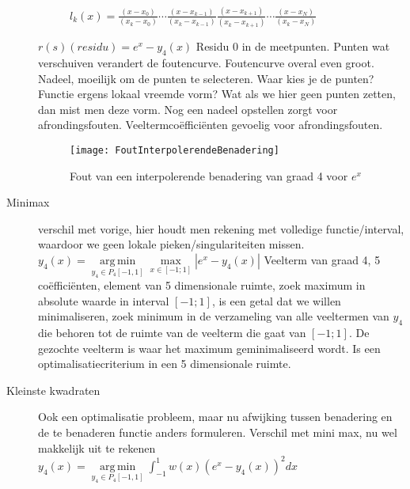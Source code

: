 \begin{exam}
\begin{description}
\begin{description}
			            \\
			            \begin{form}
				            $l_k(x)={\frac {(x-x_{0})}{(x_{k}-x_{0})}}\cdots {\frac {(x-x_{k-1})}{(x_{k}-x_{k-1})}}{\frac {(x-x_{k+1})}{(x_{k}-x_{k+1})}}\cdots {\frac {(x-x_{N})}{(x_{k}-x_{N})}}$
			            \end{form}
		      \end{description}
		      $ r(s) (residu) = e^x - y_4(x) $
		      Residu 0 in de meetpunten. Punten wat verschuiven verandert de foutencurve. Foutencurve overal even groot.
		      Nadeel, moeilijk om de punten te selecteren. Waar kies je de punten? Functie ergens lokaal vreemde vorm? Wat als we hier geen punten zetten, dan mist men deze vorm. Nog een nadeel opstellen zorgt voor afrondingsfouten. Veeltermco\"effici\"enten gevoelig voor afrondingsfouten.

		      \begin{figure}[h]
			      \centering
			      \texttt{[image: FoutInterpolerendeBenadering]}
			      \caption{Fout van een interpolerende benadering van graad 4 voor $e^x$}
		      \end{figure}

		\item [Minimax] verschil met vorige, hier houdt men rekening met volledige functie/interval, waardoor we geen lokale pieken/singulariteiten missen.
		      $y_4(x) = \underset{y_4\in P_4[-1,1]}{\operatorname {arg\,min}}\underset{x\in [-1;1]}{\operatorname {max}}|e^x - y_4(x)|$
		      Veelterm van graad 4, 5 co\"effici\"enten, element van 5 dimensionale ruimte, zoek maximum in absolute waarde in interval $[-1;1]$, is een getal dat we willen minimaliseren, zoek minimum in de verzameling van alle veeltermen van $y_4$ die behoren tot de ruimte van de veelterm die gaat van $[-1;1]$. De gezochte veelterm is waar het maximum geminimaliseerd wordt. Is een optimalisatiecriterium in een 5 dimensionale ruimte.

		\item [Kleinste kwadraten] Ook een optimalisatie probleem, maar nu afwijking tussen benadering en de te benaderen functie anders formuleren. Verschil met mini max, nu wel makkelijk uit te rekenen
		      $y_4(x) = \underset{y_4\in P_4[-1,1]}{\operatorname {arg\,min}} \int_{-1}^1 w(x) (e^x-y_4(x))^2 dx $


\end{description}
\end{exam}
